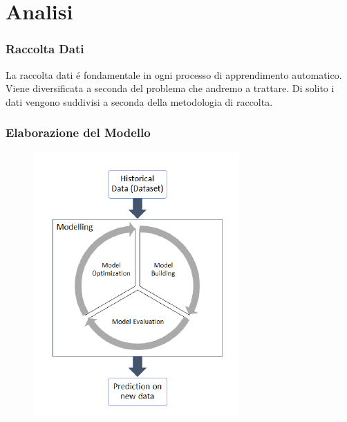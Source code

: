 \documentclass[xcolor=dvipsnames]{beamer}
\begin{document}
\section{Analisi}


\begin{frame}
    \frametitle{Raccolta Dati}
    La raccolta dati é fondamentale in ogni processo di apprendimento automatico.
    Viene diversificata a seconda del problema che andremo a trattare.
    Di solito i dati vengono suddivisi a seconda della \alert{metodologia di raccolta}.
\end{frame}

\begin{frame}
    \frametitle{Elaborazione del Modello}
    \begin{figure}[htbp]
        \includegraphics{MLProcess.png}
    \end{figure}
\end{frame}
\end{document}

